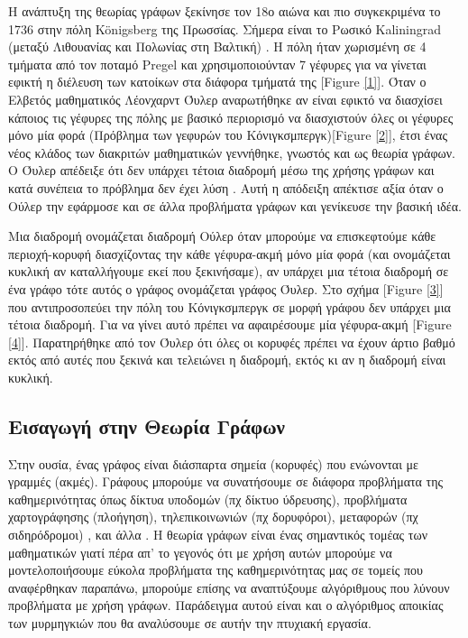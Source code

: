 Η ανάπτυξη της θεωρίας γράφων ξεκίνησε τον 18ο αιώνα και πιο συγκεκριμένα το 1736 στην πόλη Königsberg της Πρωσσίας. Σήμερα είναι το Ρωσικό Kaliningrad (μεταξύ Λιθουανίας και Πολωνίας στη Βαλτική) \cite{manwlopoulos2014thewria}. Η πόλη ήταν χωρισμένη σε 4 τμήματα από τον ποταμό Pregel και χρησιμοποιούνταν 7 γέφυρες για να γίνεται εφικτή η διέλευση των κατοίκων στα διάφορα τμήματά της [Figure \ref{1}]. Όταν ο Ελβετός μαθηματικός Λέονχαρντ Όυλερ αναρωτήθηκε αν είναι εφικτό να διασχίσει κάποιος τις γέφυρες της πόλης με βασικό περιορισμό να διασχιστούν όλες οι γέφυρες μόνο μία φορά (Πρόβλημα των γεφυρών του Κόνιγκσμπεργκ)[Figure \ref{2}], έτσι ένας νέος κλάδος των διακριτών μαθηματικών γεννήθηκε, γνωστός και ως θεωρία γράφων. Ο Όυλερ απέδειξε ότι δεν υπάρχει τέτοια διαδρομή μέσω της χρήσης γράφων και κατά συνέπεια το πρόβλημα δεν έχει λύση . Αυτή η απόδειξη απέκτισε αξία όταν ο Ούλερ την εφάρμοσε και σε άλλα προβλήματα γράφων και γενίκευσε την βασική ιδέα. 

Μια διαδρομή ονομάζεται διαδρομή Ούλερ όταν μπορούμε να επισκεφτούμε κάθε περιοχή-κορυφή διασχίζοντας την κάθε γέφυρα-ακμή μόνο μία φορά (και ονομάζεται κυκλική αν καταλλήγουμε εκεί που ξεκινήσαμε), αν υπάρχει μια τέτοια διαδρομή σε ένα γράφο τότε αυτός ο γράφος ονομάζεται γράφος Όυλερ. \cite{ntenisiwtis2023thewria} Στο σχήμα [Figure \ref{3}] που αντιπροσοπεύει την πόλη του Κόνιγκσμπεργκ σε μορφή γράφου δεν υπάρχει μια τέτοια διαδρομή. Για να γίνει αυτό πρέπει να αφαιρέσουμε μία γέφυρα-ακμή [Figure \ref{4}]. Παρατηρήθηκε από τον Όυλερ ότι όλες οι κορυφές πρέπει να έχουν άρτιο βαθμό εκτός από αυτές που ξεκινά και τελειώνει η διαδρομή, εκτός κι αν η διαδρομή είναι κυκλική. 


\subsection{Εισαγωγή στην Θεωρία Γράφων}

Στην ουσία, ένας γράφος είναι διάσπαρτα σημεία (κορυφές) που ενώνονται με γραμμές (ακμές). Γράφους μπορούμε να συνατήσουμε σε διάφορα προβλήματα της καθημερινότητας όπως δίκτυα υποδομών (πχ δίκτυο ύδρευσης), προβλήματα χαρτογράφησης (πλοήγηση), τηλεπικοινωνιών (πχ δορυφόροι), μεταφορών (πχ σιδηρόδρομοι) , και άλλα \cite{manwlopoulos2014thewria}. Η θεωρία γράφων είναι ένας σημαντικός τομέας των μαθηματικών γιατί πέρα απ' το γεγονός ότι με χρήση αυτών μπορούμε να μοντελοποιήσουμε εύκολα προβλήματα της καθημερινότητας μας σε τομείς που αναφέρθηκαν παραπάνω, μπορούμε επίσης να αναπτύξουμε αλγόριθμους που λύνουν προβλήματα με χρήση γράφων. Παράδειγμα αυτού είναι και ο αλγόριθμος αποικίας των μυρμηγκιών που θα αναλύσουμε σε αυτήν την πτυχιακή εργασία.

